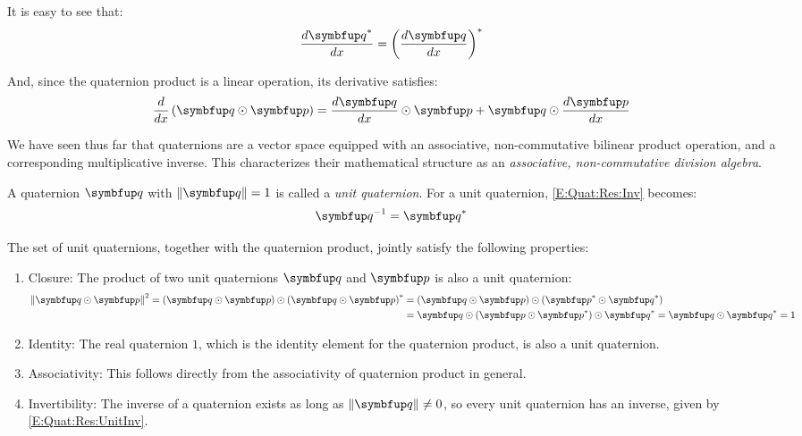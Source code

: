 It is easy to see that:
\begin{equation} \label{E:Quat:Res:DerConj}
\frac{d\qcon{\quat{q}}}{dx}= \qconp{\frac{d\quat{q}}{dx}}
\end{equation}

And, since the quaternion product is a linear operation, its derivative satisfies:
\begin{equation} \label{E:Quat:Res:DerProd}
\frac{d}{dx}\left(\quat{q} \qprod \quat{p}\right) = \frac{d\quat{q}}{dx} \qprod \quat{p} + \quat{q} \qprod \frac{d\quat{p}}{dx}
\end{equation}

We have seen thus far that quaternions are a vector space equipped with an associative, non-commutative bilinear product operation, and a corresponding multiplicative inverse. This characterizes their mathematical structure as an \emph{associative, non-commutative division algebra}.

A quaternion $\quat{q}$ with $\qnorm{\quat{q}}=1$ is called a \emph{unit quaternion}. For a unit quaternion, \eqref{E:Quat:Res:Inv} becomes:
\begin{equation} \label{E:Quat:Res:UnitInv}
\inv{\quat{q}} = \qcon{\quat{q}}
\end{equation}

The set of unit quaternions, together with the quaternion product, jointly satisfy the following properties:
\begin{enumerate}
\item Closure: The product of two unit quaternions $\quat{q}$ and $\quat{p}$ is also a unit quaternion:
\begin{equation*}
\begin{split}
\qnorm{\quat{q} \qprod \quat{p}}^2 = \left(\quat{q} \qprod \quat{p}\right) \qprod \qconp{\quat{q} \qprod \quat{p}} &= \left(\quat{q} \qprod \quat{p}\right) \qprod \left(\qcon{\quat{p}} \qprod \qcon{\quat{q}}\right) \\
&= \quat{q} \qprod \left(\quat{p} \qprod \qcon{\quat{p}} \right) \qprod \qcon{\quat{q}} = \quat{q} \qprod \qcon{\quat{q}} = 1
\end{split}
\end{equation*}
\item Identity: The real quaternion $1$, which is the identity element for the quaternion product, is also a unit quaternion.
\item Associativity: This follows directly from the associativity of quaternion product in general.
\item Invertibility: The inverse of a quaternion exists as long as $\qnorm{\quat{q}} \neq 0$, so every unit quaternion has an inverse, given by \eqref{E:Quat:Res:UnitInv}.
\end{enumerate}


